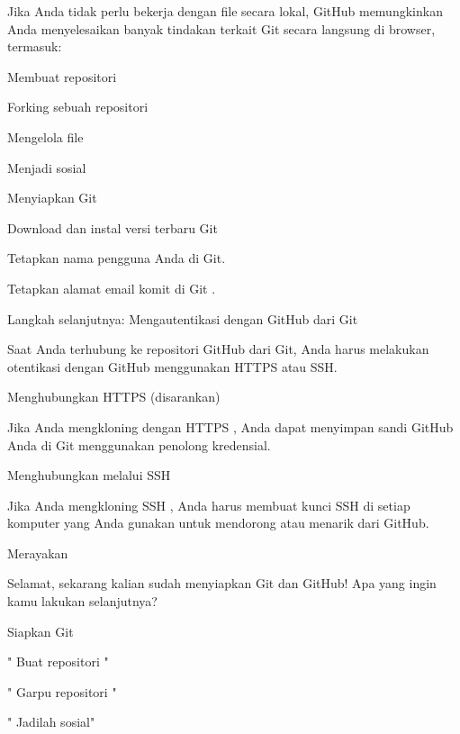 \vspace{12pt}
\noindent 
Jika Anda tidak perlu bekerja dengan file secara lokal, GitHub memungkinkan Anda menyelesaikan banyak tindakan terkait Git secara langsung di browser, termasuk: \par
\vspace{12pt}
\noindent 
Membuat repositori \par
\noindent 
Forking sebuah repositori \par
\noindent 
Mengelola file \par
\noindent 
Menjadi sosial \par
\noindent 
Menyiapkan Git \par
\noindent 
Download dan instal versi terbaru Git \par
\noindent 
Tetapkan nama pengguna Anda di Git. \par
\noindent 
Tetapkan alamat email komit di Git $  $. \par
\noindent 
Langkah selanjutnya: Mengautentikasi dengan GitHub dari Git \par
\noindent 
Saat Anda terhubung ke repositori GitHub dari Git, Anda harus melakukan otentikasi dengan GitHub menggunakan HTTPS atau SSH. \par
\noindent 
Menghubungkan HTTPS (disarankan) \par
\noindent 
Jika Anda $  $mengkloning dengan HTTPS $  $, Anda dapat $  $menyimpan sandi GitHub Anda di Git menggunakan penolong kredensial. \par
\vspace{12pt}
\noindent 
Menghubungkan melalui SSH \par
\vspace{12pt}
\noindent 
Jika Anda $  $mengkloning SSH $  $, Anda harus $  $membuat kunci SSH $  $di setiap komputer yang Anda gunakan untuk mendorong atau menarik dari GitHub. \par
\vspace{12pt}
\noindent 
Merayakan \par
\vspace{12pt}
\noindent 
Selamat, sekarang kalian sudah menyiapkan Git dan GitHub! $  $Apa yang ingin kamu lakukan selanjutnya? \par
\vspace{12pt}
\noindent 
Siapkan Git \par
\noindent 
" $  $Buat repositori $  $" \par
\noindent 
" $  $Garpu repositori $  $" \par
\noindent 
" $  $Jadilah sosial" \par
